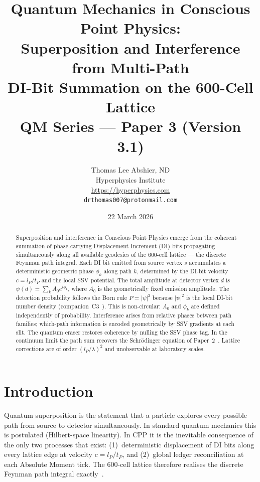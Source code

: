 \documentclass[11pt,a4paper]{article}
\title{\textbf{Quantum Mechanics in Conscious Point Physics:\\
Superposition and Interference from Multi-Path\\
DI-Bit Summation on the 600-Cell Lattice}\\[6pt]
{\large QM Series --- Paper 3 (Version 3.1)}}
\author{Thomas Lee Abshier, ND\\
Hyperphysics Institute\\
\url{https://hyperphysics.com}\\
\texttt{drthomas007@protonmail.com}}
\date{22 March 2026}
\newcommand{\lP}{l_P}
\newcommand{\tP}{t_P}
\begin{document}
\maketitle

\begin{abstract}
Superposition and interference in Conscious Point Physics emerge from
the coherent summation of phase-carrying Displacement Increment (DI)
bits propagating simultaneously along all available geodesics of the
600-cell lattice --- the discrete Feynman path integral.  Each DI bit
emitted from source vertex $s$ accumulates a deterministic geometric
phase $\phi_k$ along path $k$, determined by the DI-bit velocity
$c = \lP/\tP$ and the local SSV potential.  The total amplitude at
detector vertex $d$ is $\psi(d) = \sum_k A_0 e^{i\phi_k}$, where
$A_0$ is the geometrically fixed emission amplitude.  The detection
probability follows the Born rule $P = |\psi|^2$ because $|\psi|^2$
is the local DI-bit number density (companion~C3~\cite{abshier2026c3}).
This is non-circular: $A_0$ and $\phi_k$ are defined independently of
probability.  Interference arises from relative phases between path
families; which-path information is encoded geometrically by SSV
gradients at each slit.  The quantum eraser restores coherence by
nulling the SSV phase tag.  In the continuum limit the path sum
recovers the Schr\"{o}dinger equation of Paper~2~\cite{cpp2040a}.
Lattice corrections are of order $(\lP/\lambda)^2$ and unobservable
at laboratory scales.
\end{abstract}

\tableofcontents
\newpage

\section{Introduction}

Quantum superposition is the statement that a particle explores every
possible path from source to detector simultaneously.  In standard
quantum mechanics this is postulated (Hilbert-space linearity).  In
CPP it is the inevitable consequence of the only two processes that
exist: (1)~deterministic displacement of DI bits along every lattice
edge at velocity $c = \lP/\tP$, and (2)~global ledger reconciliation
at each Absolute Moment tick.  The 600-cell lattice therefore realises
the discrete Feynman path integral exactly~\cite{feynman1965}.
\end{document}
